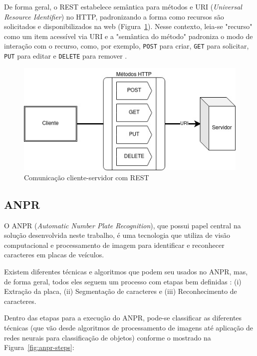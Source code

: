 \documentclass[12pt]{article}
\begin{document}
De forma geral, o REST estabelece semântica para métodos e URI (\textit{Universal Resource Identifier}) no HTTP, padronizando a forma como recursos são solicitados e disponibilizados na web (Figura~\ref{fig:rest}). Nesse contexto, leia-se "recurso" como um item acessível via URI e a "semântica do método" padroniza o modo de interação com o recurso, como, por exemplo, \texttt{POST} para criar, \texttt{GET} para solicitar, \texttt{PUT} para editar e \texttt{DELETE} para remover \cite{adamczyk2011}.

\begin{figure}[ht]
	\centering
	\includegraphics[width=.8\textwidth]{rest.jpg}
	\caption{Comunicação cliente-servidor com REST}
	\label{fig:rest}
\end{figure} 

\subsection{ANPR}

O ANPR (\textit{Automatic Number Plate Recognition}), que possui papel central na solução desenvolvida neste trabalho, é uma tecnologia que utiliza de visão computacional e processamento de imagem para identificar e reconhecer caracteres em placas de veículos.

Existem diferentes técnicas e algoritmos que podem seu usados no ANPR, mas, de forma geral, todos eles seguem um processo com etapas bem definidas \cite{mufti2021}: (i) Extração da placa, (ii) Segmentação de caracteres e (iii) Reconhecimento de caracteres.

Dentro das etapas para a execução do ANPR, \cite{shashirangana2020} pode-se classificar as diferentes técnicas (que vão desde algoritmos de processamento de imagens até aplicação de redes neurais para classificação de objetos) conforme o mostrado na Figura~\ref{fig:anpr-steps}:
\end{document}
